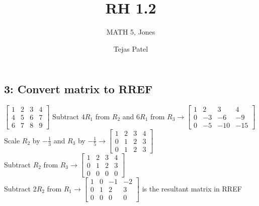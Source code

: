 \documentclass{article}
\title{RH 1.2}
\author{MATH 5, Jones}
\date{Tejas Patel}
\begin{document}
\maketitle
\subsection*{3: Convert matrix to RREF}
$
\left[\begin{array}{ccc|c}
    1 & 2 & 3 & 4 \\
    4 & 5 & 6 & 7 \\
    6 & 7 & 8 & 9 
\end{array}\right]
$ Subtract $4R_1$ from $R_2$ and $6R_1$ from $R_3 \rightarrow
\left[\begin{array}{ccc|c}
    1 & 2 & 3 & 4 \\
    0 & -3 & -6 & -9 \\
    0 & -5 & -10 & -15 
\end{array}\right]
$\\[0.1in]Scale $R_2$ by $-\frac{1}{3}$ and $R_3$ by $-\frac{1}{5} \rightarrow 
\left[\begin{array}{ccc|c}
    1 & 2 & 3 & 4 \\
    0 & 1 & 2 & 3 \\
    0 & 1 & 2 & 3 
\end{array}\right]$ \\[0.1in] Subtract $R_2$ from $R_3 \rightarrow
\left[\begin{array}{ccc|c}
    1 & 2 & 3 & 4 \\
    0 & 1 & 2 & 3 \\
    0 & 0 & 0 & 0 
\end{array}\right]$ \\[0.1in] Subtract $2R_2$ from $R_1 \rightarrow
\boxed{\left[\begin{array}{ccc|c}
    1 & 0 & -1 & -2 \\
    0 & 1 & 2 & 3 \\
    0 & 0 & 0 & 0 
\end{array}\right]}
$ is the resultant matrix in RREF
\end{document}
